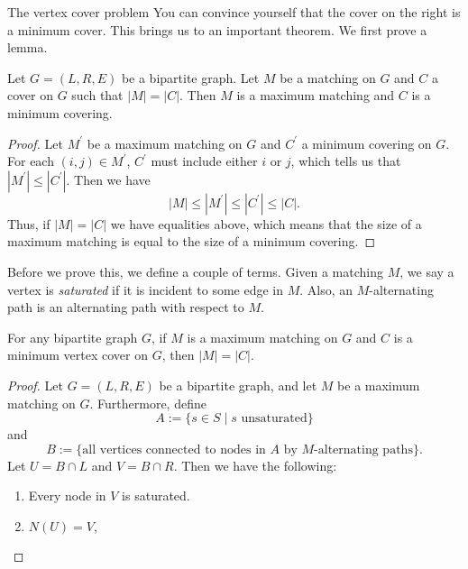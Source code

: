 \documentclass[11pt]{article}
\renewcommand{\'}{^{'}}
\newenvironment{theorem}[2][Theorem]{\begin{trivlist}
\item[\hskip \labelsep {\bfseries #1}\hskip \labelsep {\bfseries #2.}]}{\end{trivlist}}
\newenvironment{lemma}[2][Lemma]{\begin{trivlist}
\item[\hskip \labelsep {\bfseries #1}\hskip \labelsep {\bfseries #2.}]}{\end{trivlist}}
\begin{document}
\begin{section}{The vertex cover problem}
	You can convince yourself that the cover on the right is a minimum cover. This brings us 
	to an important theorem. We first prove a lemma.

	\begin{lemma}{1}
		Let $G=(L,R,E)$ be a bipartite graph. Let $M$ be a matching on $G$ and $C$ a cover on 
		$G$ such that $|M| = |C|$. Then $M$ is a maximum matching and $C$ is a minimum 
		covering.
	\end{lemma}

	\begin{proof}
		Let $M\'$ be a maximum matching on $G$ and $C\'$ a minimum covering on $G$. For each 
		$(i,j)\in M\'$, $C\'$ must include either $i$ or $j$, which tells us that 
		$|M\'| \leq |C\'|$. Then we have 
		\[
			|M|\leq |M\'| \leq |C\'| \leq |C|.
		\]
		Thus, if $|M| = |C|$ we have equalities above, which means that the size of a maximum 
		matching is equal to the size of a minimum covering.
	\end{proof}

	Before we prove this, we define a couple of terms. Given a matching $M$, we say a vertex is 
	\emph{saturated} if it is incident to some edge in $M$. Also, an $M$-alternating path is 
	an alternating path with respect to $M$.

	\begin{theorem}{(K\H{o}nig-Egervary)}
		For any bipartite graph $G$, if $M$ is a maximum matching on $G$ and $C$ is a minimum 
		vertex cover  on $G$, then $|M| = |C|$.
	\end{theorem}

	\begin{proof}
		Let $G=(L,R,E)$ be a bipartite graph, and let $M$ be a maximum matching on $G$. 
		Furthermore, define
		\[
			A := \{s\in S\; |\; s \text{ unsaturated}\}
		\]
		and
		\[
			B := \{\text{all vertices connected to nodes in $A$ by $M$-alternating paths}\}
			.
		\]
		Let $U = B\cap L$ and $V = B\cap R$. Then we have the following:

		\begin{enumerate}
			\item Every node in $V$ is saturated.
			\item $N(U) = V$,
		\end{enumerate}


\end{proof}
\end{section}
\end{document}
